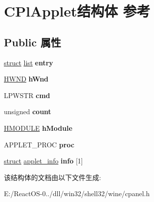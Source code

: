 \hypertarget{struct_c_pl_applet}{}\section{C\+Pl\+Applet结构体 参考}
\label{struct_c_pl_applet}
\subsection*{Public 属性}
\begin{DoxyCompactItemize}
\item 
\mbox{\label{struct_c_pl_applet_afdb9a9ae3971b97d98485b3dc3ac19ce}} 
\hyperlink{interfacestruct}{struct} \hyperlink{classlist}{list} {\bfseries entry}
\item 
\mbox{\label{struct_c_pl_applet_af19e9524bd6b88dc182406cd2e4deaee}} 
\hyperlink{interfacevoid}{H\+W\+ND} {\bfseries h\+Wnd}
\item 
\mbox{\label{struct_c_pl_applet_ace6a58198001b83a44b7d6f441b98256}} 
L\+P\+W\+S\+TR {\bfseries cmd}
\item 
\mbox{\label{struct_c_pl_applet_aff0ed4123489291bf67e3a8f1c277bf3}} 
unsigned {\bfseries count}
\item 
\mbox{\label{struct_c_pl_applet_aaa2709db48fb8d0be6b331c78677d613}} 
\hyperlink{interfacevoid}{H\+M\+O\+D\+U\+LE} {\bfseries h\+Module}
\item 
\mbox{\label{struct_c_pl_applet_aec647d55975c2df4969688b7ceba9b64}} 
A\+P\+P\+L\+E\+T\+\_\+\+P\+R\+OC {\bfseries proc}
\item 
\mbox{\label{struct_c_pl_applet_ac804207f41439f476c42b73b6cf68e51}} 
\hyperlink{interfacestruct}{struct} \hyperlink{structapplet__info}{applet\+\_\+info} {\bfseries info} \mbox{[}1\mbox{]}
\end{DoxyCompactItemize}


该结构体的文档由以下文件生成\+:\begin{DoxyCompactItemize}
\item 
E\+:/\+React\+O\+S-\/0../dll/win32/shell32/wine/cpanel.\+h\end{DoxyCompactItemize}
